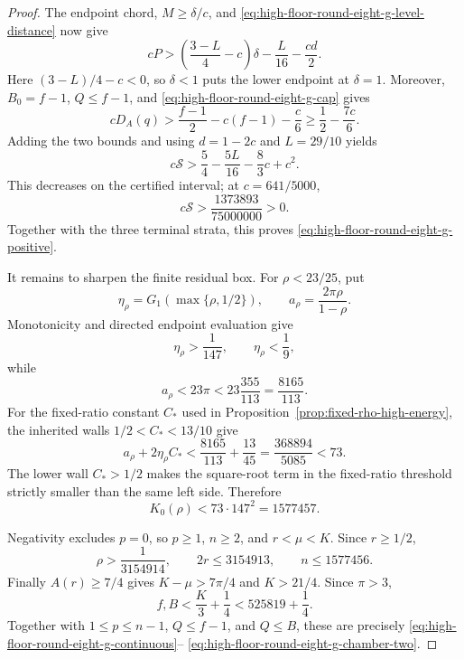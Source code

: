 \documentclass[11pt]{article}
\theoremstyle{remark}
\begin{document}
\begin{proof}
The endpoint chord, $M\geq\delta/c$, and
\eqref{eq:high-floor-round-eight-g-level-distance} now give
\[
 cP>
 \left(\frac{3-L}{4}-c\right)\delta
 -\frac L{16}-\frac{cd}{2}.
\]
Here $(3-L)/4-c<0$, so $\delta<1$ puts the lower endpoint at
$\delta=1$.  Moreover, $B_0=f-1$, $Q\leq f-1$, and
\eqref{eq:high-floor-round-eight-g-cap} gives
\[
 cD_A(q)>
 \frac{f-1}{2}-c(f-1)-\frac c6
 \geq\frac12-\frac{7c}{6}.
\]
Adding the two bounds and using $d=1-2c$ and $L=29/10$ yields
\[
 c\mathcal S>
 \frac54-\frac{5L}{16}-\frac83c+c^2.
\]
This decreases on the certified interval; at $c=641/5000$,
\begin{equation}
 \boxed{
 c\mathcal S>\frac{1373893}{75000000}>0.}
 \label{eq:high-floor-round-eight-g-small-delta}
\end{equation}
Together with the three terminal strata, this proves
\eqref{eq:high-floor-round-eight-g-positive}.

It remains to sharpen the finite residual box.  For $\rho<23/25$, put
\[
 \eta_\rho=G_1(\max\{\rho,1/2\}),\qquad
 a_\rho=\frac{2\pi\rho}{1-\rho}.
\]
Monotonicity and directed endpoint evaluation give
\begin{equation}
 \eta_\rho>\frac1{147},\qquad \eta_\rho<\frac19,
 \label{eq:high-floor-round-eight-g-eta}
\end{equation}
while
\[
 a_\rho<23\pi<23\frac{355}{113}=\frac{8165}{113}.
\]
For the fixed-ratio constant $C_*$ used in
Proposition~\ref{prop:fixed-rho-high-energy}, the inherited walls
$1/2<C_*<13/10$ give
\[
 a_\rho+2\eta_\rho C_*
 <\frac{8165}{113}+\frac{13}{45}
 =\frac{368894}{5085}<73.
\]
The lower wall $C_*>1/2$ makes the square-root term in the
fixed-ratio threshold strictly smaller than the same left side.
Therefore
\begin{equation}
 \boxed{K_0(\rho)<73\mathbin{\cdot}147^2=1577457.}
 \label{eq:high-floor-round-eight-g-cutoff}
\end{equation}

Negativity excludes $p=0$, so $p\geq1$, $n\geq2$, and
$r<\mu<K$.  Since $r\geq1/2$,
\[
 \rho>\frac1{3154914},\qquad
 2r\leq3154913,\qquad
 n\leq1577456.
\]
Finally $A(r)\geq7/4$ gives $K-\mu>7\pi/4$ and $K>21/4$.
Since $\pi>3$,
\[
 f,B<\frac K3+\frac14<525819+\frac14.
\]
Together with $1\leq p\leq n-1$, $Q\leq f-1$, and $Q\leq B$, these
are precisely \eqref{eq:high-floor-round-eight-g-continuous}--%
\eqref{eq:high-floor-round-eight-g-chamber-two}.


\end{proof}
\end{document}

